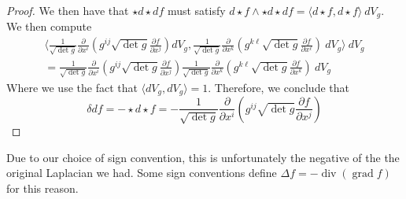 \documentclass[psamsfonts]{amsart}
\theoremstyle{definition}
\theoremstyle{remark}
\DeclareMathOperator{\dv}{div}
\DeclareMathOperator{\grad}{grad}
\begin{document}
\begin{proof}
We then have that $\star d\star df$ must satisfy $d\star f \wedge \star d\star df = \langle d\star f, d\star f \rangle~dV_g$. We then compute
\begin{align*}
\biggl\langle \frac{1}{\sqrt{\det g}} \frac{\partial}{\partial x^i}\left( g^{ij}\sqrt{\det g}\frac{\partial f}{\partial x^j} \right) dV_g, \frac{1}{\sqrt{\det g}} \frac{\partial}{\partial x^k}\left( g^{k\ell}\sqrt{\det g}\frac{\partial f}{\partial x^\ell} \right)~dV_g\biggr\rangle~dV_g  \\
= \frac{1}{\sqrt{\det g}} \frac{\partial}{\partial x^i}\left( g^{ij}\sqrt{\det g}\frac{\partial f}{\partial x^j} \right)    \frac{1}{\sqrt{\det g}} \frac{\partial}{\partial x^k}\left( g^{k\ell}\sqrt{\det g}\frac{\partial f}{\partial x^k} \right) ~dV_g
\end{align*}
Where we use the fact that $\langle dV_g, dV_g \rangle = 1$. Therefore, we conclude that 
$$\delta df = -\star d\star f = -\frac{1}{\sqrt{\det g}} \frac{\partial}{\partial x^i}\left( g^{ij}\sqrt{\det g}\frac{\partial f}{\partial x^j} \right) $$
\end{proof}
Due to our choice of sign convention, this is unfortunately the negative of the the original Laplacian we had. Some sign conventions define $\Delta f = -\dv(\grad f)$ for this reason.\\
\end{document}
